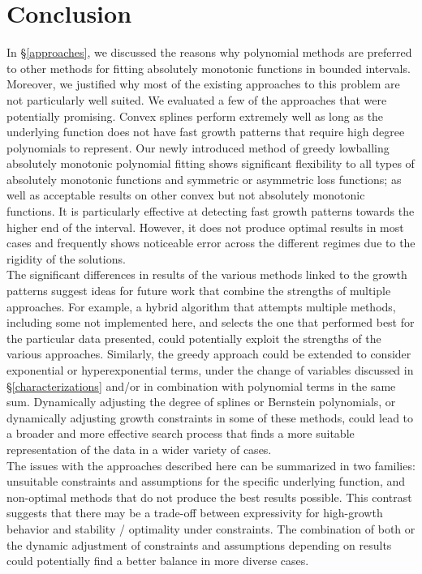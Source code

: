 \documentclass[12pt,a4paper]{article}
\begin{document}
\section{Conclusion}
\label{conclusion}

In \S \ref{approaches}, we discussed the reasons why polynomial methods are preferred to other methods for fitting absolutely monotonic functions in bounded intervals. Moreover, we justified why most of the existing approaches to this problem are not particularly well suited. We evaluated a few of the approaches that were potentially promising. Convex splines perform extremely well as long as the underlying function does not have fast growth patterns that require high degree polynomials to represent. Our newly introduced method of greedy lowballing absolutely monotonic polynomial fitting shows significant flexibility to all types of absolutely monotonic functions and symmetric or asymmetric loss functions; as well as acceptable results on other convex but not absolutely monotonic functions. It is particularly effective at detecting fast growth patterns towards the higher end of the interval. However, it does not produce optimal results in most cases and frequently shows noticeable error across the different regimes due to the rigidity of the solutions.\\

The significant differences in results of the various methods linked to the growth patterns suggest ideas for future work that combine the strengths of multiple approaches. For example, a hybrid algorithm that attempts multiple methods, including some not implemented here, and selects the one that performed best for the particular data presented, could potentially exploit the strengths of the various approaches. Similarly, the greedy approach could be extended to consider exponential or hyperexponential terms, under the change of variables discussed in \S \ref{characterizations} and/or in combination with polynomial terms in the same sum. Dynamically adjusting the degree of splines or Bernstein polynomials, or dynamically adjusting growth constraints in some of these methods, could lead to a broader and more effective search process that finds a more suitable representation of the data in a wider variety of cases.\\

The issues with the approaches described here can be summarized in two families: unsuitable constraints and assumptions for the specific underlying function, and non-optimal methods that do not produce the best results possible. This contrast suggests that there may be a trade-off between expressivity for high-growth behavior and stability / optimality under constraints. The combination of both or the dynamic adjustment of constraints and assumptions depending on results could potentially find a better balance in more diverse cases.\\
\end{document}
